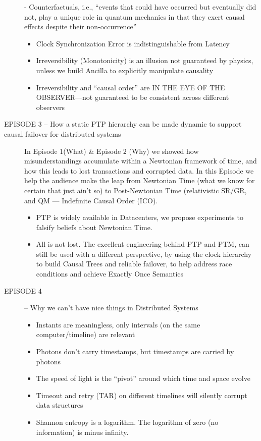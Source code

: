 \begin{description}
- Counterfactuals, i.e., “events that could have occurred but eventually did not, play a unique role in quantum mechanics in that they exert causal effects despite their non-occurrence”
	\begin{itemize}
	\item  Clock Synchronization Error is indistinguishable from Latency
	\item  Irreversibility (Monotonicity) is an illusion not guaranteed by physics, unless we build Ancilla to explicitly manipulate causality
	\item  Irreversibility and “causal order” are IN THE EYE OF THE OBSERVER—not guaranteed to be consistent across different observers
	\end{itemize}
\item [EPISODE 3 -- How a static PTP hierarchy can be made dynamic to support causal failover for distributed systems]
In Episode 1(What) \& Episode 2 (Why) we showed how misunderstandings accumulate within a Newtonian framework of time, and how this leads to lost transactions and corrupted data. In this Episode we help the audience make the leap from Newtonian Time (what we know for certain that just ain’t so) to Post-Newtonian Time (relativistic SR/GR, and QM — Indefinite Causal Order (ICO).
	\begin{itemize}
	\item PTP is widely available in Datacenters, we propose experiments to falsify beliefs about Newtonian Time.
	\item All is not lost. The excellent engineering behind PTP and PTM, can still be used with a different perspective, by using the clock hierarchy to build Causal Trees and reliable failover, to help address race conditions and achieve Exactly Once Semantics
	\end{itemize}
\item [EPISODE 4] -- Why we can’t have nice things in Distributed Systems
	\begin{itemize}
	\item  Instants are meaningless, only intervals (on the same computer/timeline) are relevant
	\item  Photons don’t carry timestamps, but timestamps are carried by photons
	\item The speed of light is the ``pivot'' around which time and space evolve
	\item Timeout and retry (TAR) on different timelines will silently corrupt data structures
	\item  Shannon entropy is a logarithm. The logarithm of zero (no information) is minus infinity.

\end{itemize}
\end{description}
